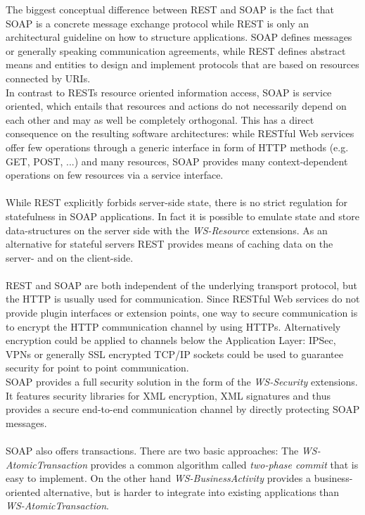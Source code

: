 The biggest conceptual difference between REST and SOAP is the fact that SOAP is a concrete message exchange protocol while REST is only an architectural guideline on how to structure applications. SOAP defines messages or generally speaking communication agreements, while REST defines abstract means and entities to design and implement protocols that are based on resources connected by URIs.
\\
In contrast to RESTs resource oriented information access, SOAP is service oriented, which entails that resources and actions do not necessarily depend on each other and may as well be completely orthogonal. This has a direct consequence on the resulting software architectures: while RESTful Web services offer few operations through a generic interface in form of HTTP methods (e.g. GET, POST, ...) and many resources, SOAP provides many context-dependent operations on few resources via a service interface.
\\ \\
While REST explicitly forbids server-side state, there is no strict regulation for statefulness in SOAP applications. In fact it is possible to emulate state and store data-structures on the server side with the \emph{WS-Resource} extensions\cite{WSRES}. As an alternative for stateful servers REST provides means of caching data on the server- and on the client-side.
\\ \\
REST and SOAP are both independent of the underlying transport protocol, but the HTTP is usually used for communication. Since RESTful Web services do not provide plugin interfaces or extension points, one way to secure communication is to encrypt the HTTP communication channel by using HTTPs. Alternatively encryption could be applied to  channels below the Application Layer: IPSec, VPNs or generally SSL encrypted TCP/IP sockets could be used to guarantee security for point to point communication.
\\
SOAP provides a full security solution in the form of the \emph{WS-Security} extensions. \cite{WSSEC} It features security libraries for XML encryption, XML signatures and thus provides a secure end-to-end communication channel by directly protecting SOAP messages.
\\ \\
SOAP also offers transactions. There are two basic approaches: The \emph{WS-AtomicTransaction} \cite{WSATOMIC} provides a common algorithm called \emph{two-phase commit} that is easy to implement. On the other hand \emph{WS-BusinessActivity} provides a business-oriented alternative, but is harder to integrate into existing applications than \emph{WS-AtomicTransaction}. \cite{RESTFULWEB}
